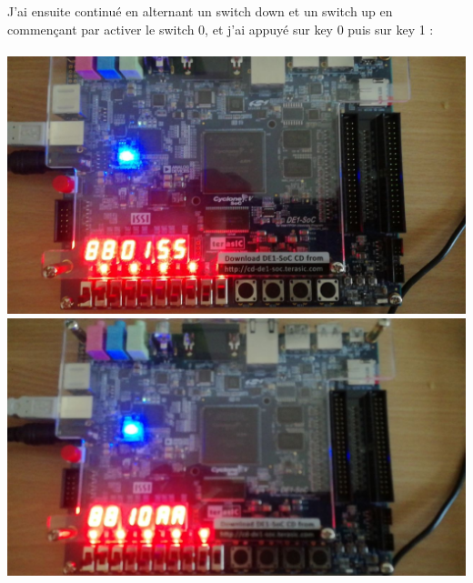 J'ai ensuite continué en alternant un switch down et un switch up en commençant par activer le switch 0, et j'ai appuyé sur key 0 puis sur key 1 : \\\\
\includegraphics[scale=0.3]{./images/appuiKey0SwitchUp.jpeg}
\includegraphics[scale=0.3]{./images/appuiKey1SwitchUp.jpeg}

